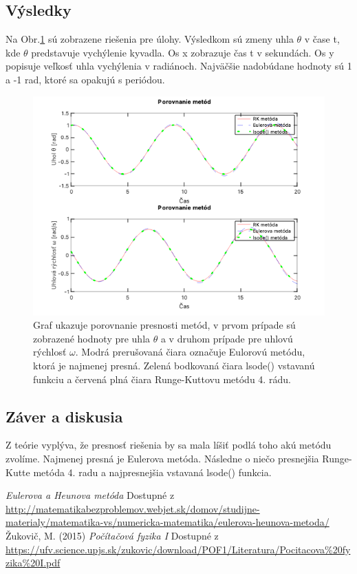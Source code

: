 \documentclass{article}
\theoremstyle{definition}
\theoremstyle{remark}
\begin{document}
\subsection{Výsledky}
Na Obr.\ref{fig:dx001} sú zobrazene riešenia pre úlohy. Výsledkom sú zmeny uhla $\theta$ v čase t, kde $\theta$ predstavuje vychýlenie kyvadla. Os x zobrazuje čas t v sekundách. Os y popisuje veľkosť uhla vychýlenia v radiánoch. Najväčšie nadobúdane hodnoty sú 1 a -1 rad, ktoré sa opakujú s periódou. 
\begin{figure}[H]
  \centering
  \includegraphics[width=1\textwidth]{graph_hw2.png}
  \caption{Graf ukazuje porovnanie presnosti metód, v prvom prípade sú zobrazené hodnoty pre uhla $\theta$ a v druhom prípade pre uhlovú rýchlosť $\omega$. Modrá prerušovaná čiara označuje Eulorovú metódu, ktorá je najmenej presná. Zelená bodkovaná čiara lsode() vstavanú funkciu a červená plná čiara Runge-Kuttovu metódu 4. rádu.
  }
  \label{fig:dx001}
\end{figure}





\subsection{Záver a diskusia}

Z teórie vyplýva, že presnosť riešenia by sa mala líšiť podlá toho akú metódu zvolíme. Najmenej presná je Eulerova metóda. Následne o niečo presnejšia Runge-Kutte metóda 4. radu a najpresnejšia vstavaná lsode() funkcia.

\pagebreak
\begin{thebibliography}{99}
 \emph{Eulerova a Heunova metóda} Dostupné z \url{http://matematikabezproblemov.webjet.sk/domov/studijne-materialy/matematika-vs/numericka-matematika/eulerova-heunova-metoda/}
Žukovič, M. (2015) \emph{Počítačová fyzika I} Dostupné z \url{https://ufv.science.upjs.sk/zukovic/download/POF1/Literatura/Pocitacova%20fyzika%20I.pdf}
\end{thebibliography}
\end{document}
